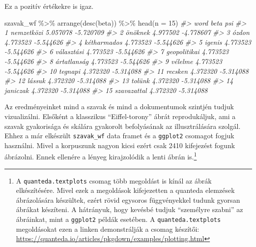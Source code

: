 \documentclass[
]{book}
\newenvironment{Shaded}{\begin{snugshade}}{\end{snugshade}}
\newcommand{\AttributeTok}[1]{\textcolor[rgb]{0.77,0.63,0.00}{#1}}
\newcommand{\CommentTok}[1]{\textcolor[rgb]{0.56,0.35,0.01}{\textit{#1}}}
\newcommand{\DecValTok}[1]{\textcolor[rgb]{0.00,0.00,0.81}{#1}}
\newcommand{\FunctionTok}[1]{\textcolor[rgb]{0.00,0.00,0.00}{#1}}
\newcommand{\NormalTok}[1]{#1}
\newcommand{\SpecialCharTok}[1]{\textcolor[rgb]{0.00,0.00,0.00}{#1}}
\begin{document}
Ez a pozitív értékekre is igaz.

\begin{Shaded}
\begin{Highlighting}[]
\NormalTok{szavak\_wf }\SpecialCharTok{\%\textgreater{}\%} 
  \FunctionTok{arrange}\NormalTok{(}\FunctionTok{desc}\NormalTok{(beta)) }\SpecialCharTok{\%\textgreater{}\%} 
  \FunctionTok{head}\NormalTok{(}\AttributeTok{n =} \DecValTok{15}\NormalTok{)}
\CommentTok{\#\textgreater{}            word     beta       psi}
\CommentTok{\#\textgreater{} 1    nemzetközi 5.057078 {-}5.720709}
\CommentTok{\#\textgreater{} 2       önöknek 4.977502 {-}4.778607}
\CommentTok{\#\textgreater{} 3         ózdon 4.773523 {-}5.544626}
\CommentTok{\#\textgreater{} 4   kétharmados 4.773523 {-}5.544626}
\CommentTok{\#\textgreater{} 5        igenis 4.773523 {-}5.544626}
\CommentTok{\#\textgreater{} 6    választási 4.773523 {-}5.544626}
\CommentTok{\#\textgreater{} 7  geopolitikai 4.773523 {-}5.544626}
\CommentTok{\#\textgreater{} 8   ártatlanság 4.773523 {-}5.544626}
\CommentTok{\#\textgreater{} 9       vélelme 4.773523 {-}5.544626}
\CommentTok{\#\textgreater{} 10      tegnapi 4.372320 {-}5.314088}
\CommentTok{\#\textgreater{} 11      recsken 4.372320 {-}5.314088}
\CommentTok{\#\textgreater{} 12       lássuk 4.372320 {-}5.314088}
\CommentTok{\#\textgreater{} 13       tolünk 4.372320 {-}5.314088}
\CommentTok{\#\textgreater{} 14     janiczak 4.372320 {-}5.314088}
\CommentTok{\#\textgreater{} 15  szavazattal 4.372320 {-}5.314088}
\end{Highlighting}
\end{Shaded}

Az eredményeinket mind a szavak és mind a dokumentumok szintjén tudjuk
vizualizálni. Elsőként a klasszikus ``Eiffel-torony'' ábrát
reprodukáljuk, ami a szavak gyakorisága és skálára gyakorolt
befolyásának az illusztrálására szolgál. Ehhez a már elkészült
\texttt{szavak\_wf} data framet és a \texttt{ggplot2} csomagot fogjuk
használni. Mivel a korpuszunk nagyon kicsi ezért csak 2410 kifejezést
fogunk ábrázolni. Ennek ellenére a lényeg kirajzolódik a lenti ábrán
is.\footnote{A \texttt{quanteda.textplots} csomag több megoldást is
  kínál az ábrák elkészítésére. Mivel ezek a megoldások kifejezetten a
  quanteda elemzések ábrázolására készültek, ezért rövid egysoros
  függvényekkel tudunk gyorsan ábrákat készíteni. A hátrányuk, hogy
  kevésbé tudjuk ``személyre szabni'' az ábráinkat, mint a
  \texttt{ggplot2} példák esetében. A \texttt{quanteda.textplots}
  megoldásokat ezen a linken demonstrálják a csomag készítői:
  \url{https://quanteda.io/articles/pkgdown/examples/plotting.html}}
\end{document}
